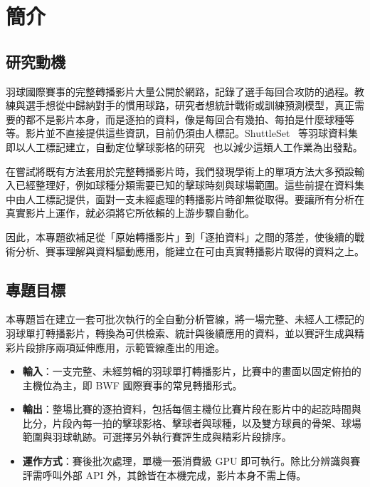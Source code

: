\chapter{簡介}
\label{ch:introduction}

\section{研究動機}
\label{sec:motivation}

羽球國際賽事的完整轉播影片大量公開於網路，記錄了選手每回合攻防的過程。教練與選手想從中歸納對手的慣用球路，研究者想統計戰術或訓練預測模型，真正需要的都不是影片本身，而是逐拍的資料，像是每回合有幾拍、每拍是什麼球種等等。影片並不直接提供這些資訊，目前仍須由人標記。ShuttleSet~\cite{shuttleset} 等羽球資料集即以人工標記建立，自動定位擊球影格的研究~\cite{chien2023hitframe} 也以減少這類人工作業為出發點。

在嘗試將既有方法套用於完整轉播影片時，我們發現學術上的單項方法大多預設輸入已經整理好，例如球種分類需要已知的擊球時刻與球場範圍。這些前提在資料集中由人工標記提供，面對一支未經處理的轉播影片時卻無從取得。要讓所有分析在真實影片上運作，就必須將它所依賴的上游步驟自動化。

因此，本專題欲補足從「原始轉播影片」到「逐拍資料」之間的落差，使後續的戰術分析、賽事理解與資料驅動應用，能建立在可由真實轉播影片取得的資料之上。

\section{專題目標}
\label{sec:goals}

本專題旨在建立一套可批次執行的全自動分析管線，將一場完整、未經人工標記的羽球單打轉播影片，轉換為可供檢索、統計與後續應用的資料，並以賽評生成與精彩片段排序兩項延伸應用，示範管線產出的用途。

\begin{itemize}
  \item \textbf{輸入}：一支完整、未經剪輯的羽球單打轉播影片，比賽中的畫面以固定俯拍的主機位為主，即 BWF 國際賽事的常見轉播形式。
  \item \textbf{輸出}：整場比賽的逐拍資料，包括每個主機位比賽片段在影片中的起訖時間與比分，片段內每一拍的擊球影格、擊球者與球種，以及雙方球員的骨架、球場範圍與羽球軌跡。可選擇另外執行賽評生成與精彩片段排序。
  \item \textbf{運作方式}：賽後批次處理，單機一張消費級 GPU 即可執行。除比分辨識與賽評需呼叫外部 API 外，其餘皆在本機完成，影片本身不需上傳。
\end{itemize}

